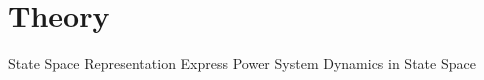 \section[Theory]{Theory}
\label{sec:lasso_theory}

\begin{frame}[fragile]{State Space Representation}
	Express Power System Dynamics in State Space
\end{frame}